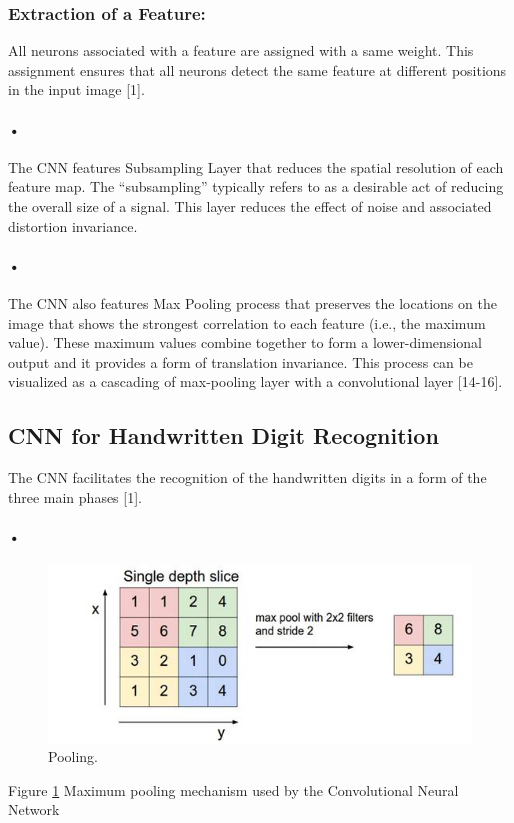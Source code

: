 \documentclass{article}
\begin{document}
\subsubsection{Extraction of a Feature: }
All neurons associated with a feature are assigned with a same weight. This assignment ensures that all neurons detect the same feature at different positions in the input image [1]. 
\paragraph{•}
The CNN features Subsampling Layer that reduces the spatial resolution of each feature map. The “subsampling” typically refers to as a desirable act of reducing the overall size of a signal. This layer reduces the effect of noise and associated distortion invariance. 
\paragraph{•}
The CNN also features Max Pooling process that preserves the locations on the image that shows the strongest correlation to each feature (i.e., the maximum value). These maximum values combine together to form a lower-dimensional output and it provides a form of translation invariance. This process can be visualized as a cascading of max-pooling layer with a convolutional layer [14-16].

 
 
\subsection{CNN for Handwritten Digit Recognition }
The CNN facilitates the recognition of the handwritten digits in a form of the three main phases [1]. 
\paragraph{•}
\begin{figure}
  \includegraphics[width=\linewidth]{Pooling.png}
  \caption{Pooling.}
  \label{fig:Pooling}
\end{figure}
Figure \ref{fig:Pooling} Maximum pooling mechanism used by the Convolutional Neural Network
\end{document}
